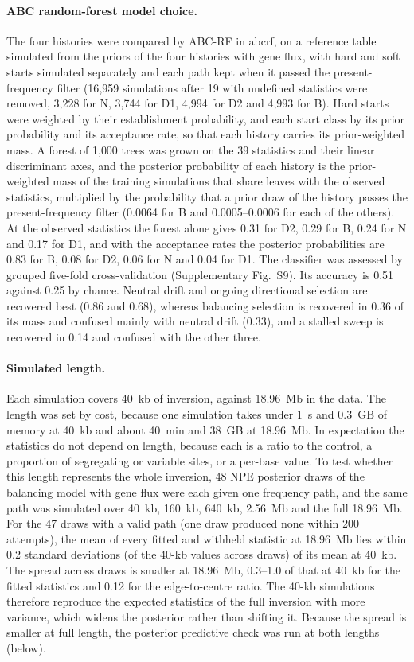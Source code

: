 \documentclass[11pt]{article}
\begin{document}
\paragraph{ABC random-forest model choice.}
The four histories were compared by ABC-RF \citep{pudlo2016} in abcrf, on a reference table simulated from the priors of the four histories with gene flux, with hard and soft starts simulated separately and each path kept when it passed the present-frequency filter (16{,}959 simulations after 19 with undefined statistics were removed, 3{,}228 for N, 3{,}744 for D1, 4{,}994 for D2 and 4{,}993 for B). Hard starts were weighted by their establishment probability, and each start class by its prior probability and its acceptance rate, so that each history carries its prior-weighted mass. A forest of 1{,}000 trees was grown on the 39 statistics and their linear discriminant axes, and the posterior probability of each history is the prior-weighted mass of the training simulations that share leaves with the observed statistics, multiplied by the probability that a prior draw of the history passes the present-frequency filter (0.0064 for B and 0.0005--0.0006 for each of the others). At the observed statistics the forest alone gives 0.31 for D2, 0.29 for B, 0.24 for N and 0.17 for D1, and with the acceptance rates the posterior probabilities are 0.83 for B, 0.08 for D2, 0.06 for N and 0.04 for D1. The classifier was assessed by grouped five-fold cross-validation (Supplementary Fig.~S9). Its accuracy is 0.51 against 0.25 by chance. Neutral drift and ongoing directional selection are recovered best (0.86 and 0.68), whereas balancing selection is recovered in 0.36 of its mass and confused mainly with neutral drift (0.33), and a stalled sweep is recovered in 0.14 and confused with the other three.

\paragraph{Simulated length.}
Each simulation covers 40~kb of inversion, against 18.96~Mb in the data. The length was set by cost, because one simulation takes under 1~s and 0.3~GB of memory at 40~kb and about 40~min and 38~GB at 18.96~Mb. In expectation the statistics do not depend on length, because each is a ratio to the control, a proportion of segregating or variable sites, or a per-base value. To test whether this length represents the whole inversion, 48 NPE posterior draws of the balancing model with gene flux were each given one frequency path, and the same path was simulated over 40~kb, 160~kb, 640~kb, 2.56~Mb and the full 18.96~Mb. For the 47 draws with a valid path (one draw produced none within 200 attempts), the mean of every fitted and withheld statistic at 18.96~Mb lies within 0.2 standard deviations (of the 40-kb values across draws) of its mean at 40~kb. The spread across draws is smaller at 18.96~Mb, 0.3--1.0 of that at 40~kb for the fitted statistics and 0.12 for the edge-to-centre ratio. The 40-kb simulations therefore reproduce the expected statistics of the full inversion with more variance, which widens the posterior rather than shifting it. Because the spread is smaller at full length, the posterior predictive check was run at both lengths (below).
\end{document}
